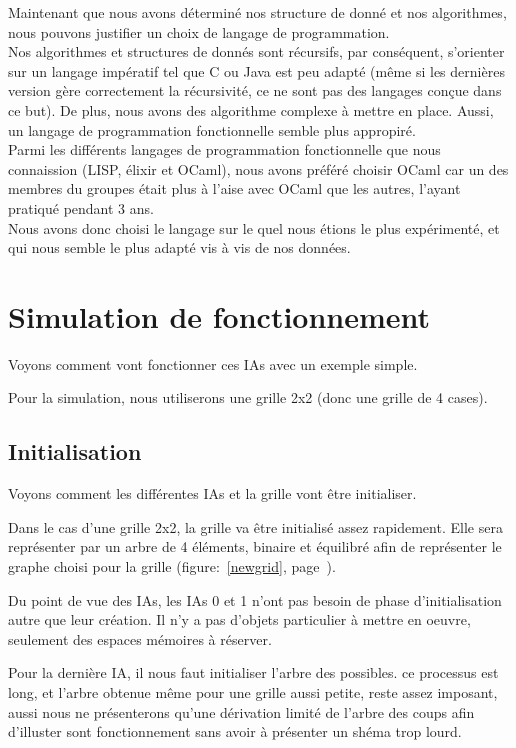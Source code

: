 \documentclass[a4paper,12pt]{report}
\begin{document}
Maintenant que nous avons d\'etermin\'e nos structure de donn\'e et nos algorithmes, nous pouvons justifier un choix de langage de programmation. \\
Nos algorithmes et structures de donn\'es sont r\'ecursifs, par cons\'equent, s'orienter sur un langage imp\'eratif tel que C ou Java est peu adapt\'e (m\^eme si les derni\`eres version g\`ere correctement la r\'ecursivit\'e, ce ne sont pas des langages con\c{c}ue dans ce but). De plus, nous avons des algorithme complexe \`a mettre en place. Aussi, un langage de programmation fonctionnelle semble plus appropir\'e. \\
Parmi les diff\'erents langages de programmation fonctionnelle que nous connaission (LISP, \'elixir et OCaml), nous avons pr\'ef\'er\'e choisir OCaml car un des membres du groupes \'etait plus \`a l'aise avec OCaml que les autres, l'ayant pratiqu\'e pendant 3 ans. \\
Nous avons donc choisi le langage sur le quel nous \'etions le plus exp\'eriment\'e, et qui nous semble le plus adapt\'e vis \`a vis de nos donn\'ees.

\part{Simulation de fonctionnement}

Voyons comment vont fonctionner ces IAs avec un exemple simple. 


Pour la simulation, nous utiliserons une grille 2x2 (donc une grille de 4 cases). 

\chapter{Initialisation}

Voyons comment les diff\'erentes IAs et la grille vont \^etre initialiser. 

Dans le cas d'une grille 2x2, la grille va \^etre initialis\'e assez rapidement. Elle sera repr\'esenter par un arbre de 4 \'el\'ements, binaire et \'equilibr\'e afin de repr\'esenter le graphe choisi pour la grille (figure:~\autoref{newgrid}, page~\pageref{newgrid}).

Du point de vue des IAs, les IAs 0 et 1 n'ont pas besoin de phase d'initialisation autre que leur cr\'eation. Il n'y a pas d'objets particulier \`a mettre en oeuvre, seulement des espaces m\'emoires \`a r\'eserver. 

Pour la derni\`ere IA, il nous faut initialiser l'arbre des possibles. ce processus est long, et l'arbre obtenue m\^eme pour une grille aussi petite, reste assez imposant, aussi nous ne pr\'esenterons qu'une d\'erivation limit\'e de l'arbre des coups afin d'illuster sont fonctionnement sans avoir \`a pr\'esenter un sh\'ema trop lourd.
\end{document}
